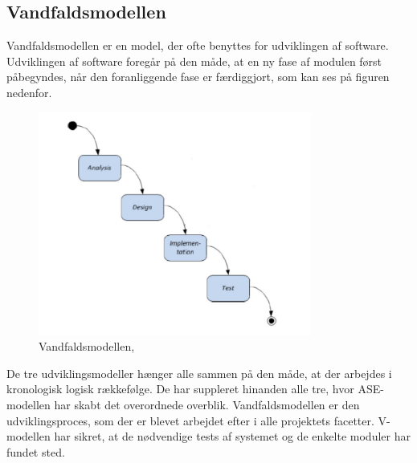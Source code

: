 \subsection{Vandfaldsmodellen}
Vandfaldsmodellen er en model, der ofte benyttes for udviklingen af software. Udviklingen af software foregår på den måde, at en ny fase af modulen først påbegyndes, når den foranliggende fase er færdiggjort, som kan ses på figuren nedenfor. 
\begin{figure}[H]
	\centering
	\includegraphics[width=0.8\textwidth]{Figurer/vfmodel}
	\caption{Vandfaldsmodellen, \protect\cite{ISE}}
\end{figure}
De tre udviklingsmodeller hænger alle sammen på den måde, at der arbejdes i kronologisk logisk rækkefølge. De har suppleret hinanden alle tre, hvor ASE-modellen har skabt det overordnede overblik. Vandfaldsmodellen er den udviklingsproces, som der er blevet arbejdet efter i alle projektets facetter. V-modellen har sikret, at de nødvendige tests af systemet og de enkelte moduler har fundet sted. 



